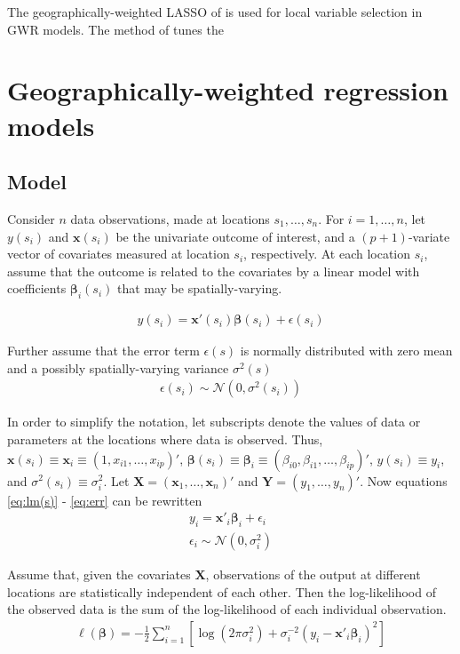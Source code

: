 \documentclass[authoryear, review, 11pt]{elsarticle}
\begin{document}
	The geographically-weighted LASSO of \cite{Wheeler:2009} is used for local variable selection in GWR models. The method of \cite{Wheeler} tunes the \\

	
\section{Geographically-weighted regression models \label{section:GWR}}

	\subsection{Model}
	Consider $n$ data observations, made at locations $s_1, \dots, s_n$. For $i = 1, \dots, n$, let $y(s_i)$ and $\bm{x}(s_i)$ be the univariate outcome of interest, and a $(p+1)$-variate vector of covariates measured at location $s_i$, respectively. At each location $s_i$, assume that the outcome is related to the covariates by a linear model with coefficients $\bm{\beta}_i(s_i)$ that may be spatially-varying.

	\begin{eqnarray}
		y(s_i) = \bm{x}'(s_i) \bm{\beta}(s_i) + \epsilon(s_i)
	\label{eq:lm(s)}
	\end{eqnarray}
	
	Further assume that the error term $\epsilon(s)$ is normally distributed with zero mean and a possibly spatially-varying variance $\sigma^2(s)$
	\begin{eqnarray}
		\epsilon(s_i) \sim \mathcal{N} \left( 0,\sigma^2(s_i) \right)
	\label{eq:err}
	\end{eqnarray}
	
	In order to simplify the notation, let subscripts denote the values of data or parameters at the locations where data is observed. Thus, $\bm{x}(s_i) \equiv \bm{x}_i \equiv \left( 1, x_{i1}, \dots, x_{ip} \right)'$, $\bm{\beta}(s_i) \equiv \bm{\beta}_i \equiv \left(\beta_{i0}, \beta_{i1}, \dots, \beta_{ip} \right)'$, $y(s_i) \equiv y_i$, and $\sigma^2(s_i) \equiv \sigma^2_i$. Let $\bm{X} = \left( \bm{x}_1, \dots, \bm{x}_n \right)'$ and $\bm{Y} = \left( y_1, \dots, y_n \right)'$. Now equations \ref{eq:lm(s)} - \ref{eq:err} can be rewritten
	\begin{eqnarray}
		y_i = \bm{x}'_i \bm{\beta}_i + \epsilon_i\\
		\epsilon_i \sim \mathcal{N} \left( 0,\sigma_i^2 \right)
	\end{eqnarray}
	
	Assume that, given the covariates $\bm{X}$, observations of the output at different locations are statistically independent of each other. Then the log-likelihood of the observed data is the sum of the log-likelihood of each individual observation.
	 \begin{eqnarray}
	 	\ell\left( \bm{\beta} \right) = - \frac{1}{2} \sum_{i=1}^n \left[  \log \left( 2 \pi \sigma^2_i\right) +  \sigma^{-2}_i  \left(y_i - \bm{x}'_i\bm{\beta}_i \right)^2  \right]
	\end{eqnarray}
	
\end{document}

